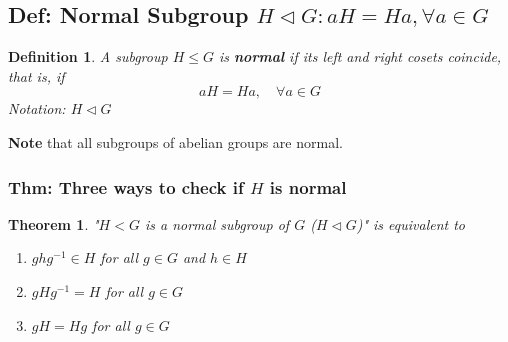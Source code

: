 \documentclass[11pt,a4paper]{article}
\newtheorem{theorem}{Theorem}
\newtheorem{definition}{Definition}
\begin{document}
\subsection{Def: Normal Subgroup $H\lhd G: aH=Ha,\forall a\in G$}
\begin{definition}
    A subgroup $H\leq G$ is \textbf{normal} if its left and right cosets coincide, that is, if $$aH=Ha,\quad \forall a\in G$$
    Notation: $H \lhd G$
\end{definition}
\textbf{Note} that all subgroups of abelian groups are normal.


\subsubsection{Thm: Three ways to check if $H$ is normal}
\begin{theorem}
    "$H<G$ is a normal subgroup of $G$ ($H\lhd G$)" is equivalent to
    \begin{enumerate}[(1)]
        \item $ghg^{-1}\in H$ for all $g\in G$ and $h\in H$
        \item $gHg^{-1}=H$ for all $g\in G$
        \item $gH=Hg$ for all $g\in G$
    \end{enumerate}
\end{theorem}
\end{document}
